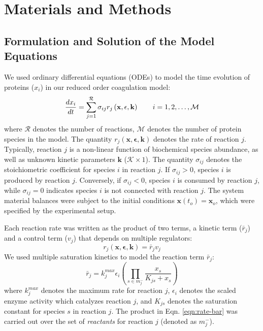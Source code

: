 \documentclass[processes,article,received,moreauthors,pdftex,12pt,a4paper]{mdpi}
\begin{document}
\section{Materials and Methods}
\vspace{-12pt}

\subsection{Formulation and Solution of the Model Equations
}

We used ordinary differential equations (ODEs) to model the time evolution of proteins ($x_{i}$) in our reduced order coagulation model:
\begin{equation}
	\frac{dx_{i}}{dt}  =  \sum_{j = 1}^{\mathcal{R}}\sigma_{ij}r_{j}\left(\mathbf{x},\mathbf{\epsilon},\mathbf{k}\right)\qquad{i=1,2,\hdots,\mathcal{M}}\\
\end{equation}
where $\mathcal{R}$ denotes the number of reactions, $\mathcal{M}$ denotes the number of protein species in the model. 
The quantity $r_{j}\left(\mathbf{x},\mathbf{\epsilon},\mathbf{k}\right)$ denotes the rate of reaction $j$. 
Typically, reaction $j$ is a non-linear function of biochemical species abundance, as well as unknown kinetic parameters $\mathbf{k}$ ($\mathcal{K}\times{1}$). 
The quantity $\sigma_{ij}$ denotes the stoichiometric coefficient for species $i$ in reaction $j$. 
If $\sigma_{ij}>0$, species $i$ is produced by reaction $j$. 
Conversely, if $\sigma_{ij}<0$, species $i$ is consumed by reaction $j$, while $\sigma_{ij} = 0$ indicates species $i$ is not connected with reaction $j$. 
The system material balances were subject to the initial conditions $\mathbf{x}\left(t_{o}\right) = \mathbf{x}_{o}$, which were specified by the experimental setup.

Each reaction rate was written as the product of two terms, a kinetic term ($\bar{r}_{j}$) and a control term ($v_{j}$) that depends on multiple regulators:
\begin{equation}\label{eqn:rate-factor}
	r_{j}\left(\mathbf{x},\mathbf{\epsilon},\mathbf{k}\right) = \bar{r}_{j}v_{j}
\end{equation}
We used multiple saturation kinetics to model the reaction term $\bar{r}_{j}$:
\begin{equation}\label{eqn:rate-bar}
	\bar{r}_{j} = k_{j}^{max}\epsilon_{i}\left(\prod_{s\in{m_{j}^{-}}}\frac{x_{s}}{K_{js} + x_{s}}\right)
\end{equation}where $k_{j}^{max}$ denotes the maximum rate for reaction $j$, $\epsilon_{i}$ denotes the scaled enzyme activity which catalyzes reaction $j$, and
$K_{js}$ denotes the saturation constant for species $s$ in reaction $j$. 
The product in Eqn. \eqref{eqn:rate-bar} was carried out over the set of \textit{reactants} for reaction $j$ (denoted as $m_{j}^{-}$). 
\end{document}
